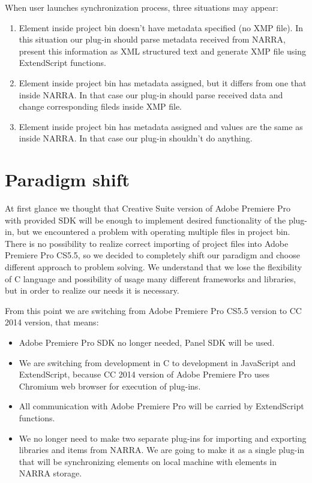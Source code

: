 \documentclass[thesis=B,english]{FITthesis}[2012/10/20]
\begin{document}
When user launches synchronization process, three situations may appear:
	\begin{enumerate}
		\item Element inside project bin doesn't have metadata specified (no XMP file). In this situation our plug-in should parse metadata received from NARRA, present this information as XML structured text and generate XMP file using ExtendScript functions.
		\item Element inside project bin has metadata assigned, but it differs from one that inside NARRA. In that case our plug-in should parse received data and change corresponding fileds inside XMP file.
		\item Element inside project bin has metadata assigned and values are the same as inside NARRA. In that case our plug-in shouldn't do anything.
	\end{enumerate}
\chapter{Paradigm shift}
At first glance we thought that Creative Suite version of Adobe Premiere Pro with provided SDK will be enough to implement desired functionality of the plug-in, but we encountered a problem with operating multiple files in project bin. There is no possibility to realize correct importing of project files into Adobe Premiere Pro CS5.5, so we decided to completely shift our paradigm and choose different approach to problem solving. We understand that we lose the flexibility of C language and possibility of usage many different frameworks and libraries, but in order to realize our needs it is necessary.

From this point we are switching from Adobe Premiere Pro CS5.5 version to CC 2014 version, that means:
	\begin{itemize}
		\item Adobe Premiere Pro SDK no longer needed, Panel SDK will be used.
		\item We are switching from development in C to development in JavaScript and ExtendScript, because CC 2014 version of Adobe Premiere Pro uses Chromium web browser for execution of plug-ins.
		\item All communication with Adobe Premiere Pro will be carried by ExtendScript functions.
		\item We no longer need to make two separate plug-ins for importing and exporting libraries and items from NARRA. We are going to make it as a single plug-in that will be synchronizing elements on local machine with elements in NARRA storage. 
	\end{itemize}
\end{document}
